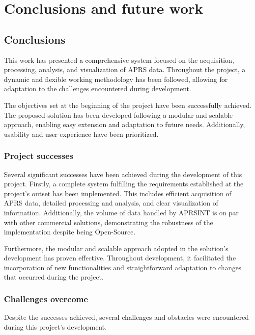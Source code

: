 \chapter*{Conclusions and future work}
\label{cap:conclusions}

\section{Conclusions}

This work has presented a comprehensive system focused on the acquisition, processing, analysis, and visualization of APRS data. Throughout the project, a dynamic and flexible working methodology has been followed, allowing for adaptation to the challenges encountered during development.

The objectives set at the beginning of the project have been successfully achieved. The proposed solution has been developed following a modular and scalable approach, enabling easy extension and adaptation to future needs. Additionally, usability and user experience have been prioritized.

\subsection{Project successes}

Several significant successes have been achieved during the development of this project. Firstly, a complete system fulfilling the requirements established at the project's outset has been implemented. This includes efficient acquisition of APRS data, detailed processing and analysis, and clear visualization of information. Additionally, the volume of data handled by APRSINT is on par with other commercial solutions, demonstrating the robustness of the implementation despite being Open-Source.

Furthermore, the modular and scalable approach adopted in the solution's development has proven effective. Throughout development, it facilitated the incorporation of new functionalities and straightforward adaptation to changes that occurred during the project.

\subsection{Challenges overcome}

Despite the successes achieved, several challenges and obstacles were encountered during this project's development.


